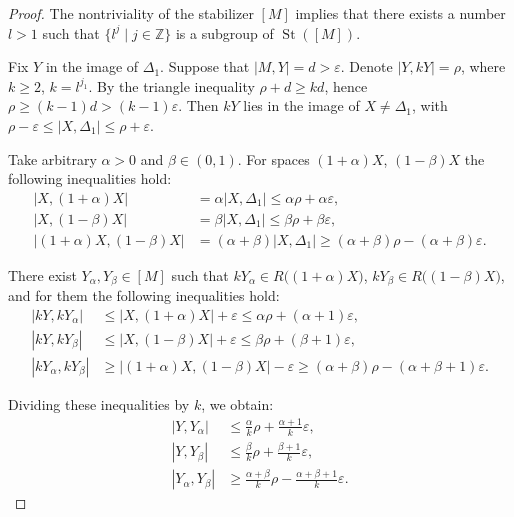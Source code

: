 \begin{proof}
  The nontriviality of the stabilizer $[M]$ implies that there exists
  a number $l > 1$ such that $\{l^{j} \mid j\in \mathbb{Z}\}$ is a
  subgroup of $\operatorname{St}([M])$.

  Fix $Y$ in the image of $\Delta_{1}$. Suppose that $|M, Y| = d >
  \varepsilon$. Denote $|Y, kY| = \rho$, where $k \geq 2$, $k =
  l^{j_{1}}$. By the triangle inequality $\rho + d \geq kd$, hence
  $\rho \geq (k-1)d > (k-1)\varepsilon$. Then $kY$ lies in the image
  of $X \neq \Delta_1$, with $\rho - \varepsilon \leq |X, \Delta_1|
  \leq \rho + \varepsilon$.

  Take arbitrary $\alpha > 0$ and $\beta \in (0,1)$. For spaces
  $(1+\alpha)X$, $(1-\beta)X$ the following inequalities hold:
  \begin{align*}
    |X, (1+\alpha)X| &= \alpha |X, \Delta_1| \leq \alpha\rho +
    \alpha\varepsilon, \\
    |X, (1-\beta)X| &= \beta|X, \Delta_1| \leq \beta\rho +
    \beta\varepsilon, \\
    |(1+\alpha) X, (1-\beta)X| &= (\alpha + \beta)|X, \Delta_1| \geq
    (\alpha+\beta)\rho - (\alpha+\beta)\varepsilon.
  \end{align*}

  There exist $Y_\alpha, Y_\beta \in [M]$ such that $kY_\alpha \in
  R\big((1+\alpha)X\big)$, $kY_\beta \in R\big((1-\beta)X\big)$, and
  for them the following inequalities hold:
  \begin{align*}
    |kY, kY_\alpha| &\leq |X, (1+\alpha)X| + \varepsilon \leq
    \alpha\rho + (\alpha+1)\varepsilon, \\
    |kY, kY_\beta| &\leq |X, (1-\beta)X| + \varepsilon \leq \beta\rho
    + (\beta+1)\varepsilon, \\
    |kY_\alpha, kY_\beta| &\geq |(1+\alpha)X, (1-\beta)X| -
    \varepsilon \geq (\alpha+\beta)\rho - (\alpha+\beta+1)\varepsilon.
  \end{align*}

  Dividing these inequalities by $k$, we obtain:
  \begin{align*}
    |Y, Y_{\alpha}| &\leq \frac{\alpha}{k}\rho +
    \frac{\alpha+1}{k}\varepsilon, \\
    |Y, Y_{\beta}| &\leq \frac{\beta}{k}\rho +
    \frac{\beta+1}{k}\varepsilon, \\
    |Y_\alpha, Y_{\beta}| &\geq \frac{\alpha+\beta}{k}\rho -
    \frac{\alpha+\beta+1}{k}\varepsilon.
  \end{align*}


\end{proof}
